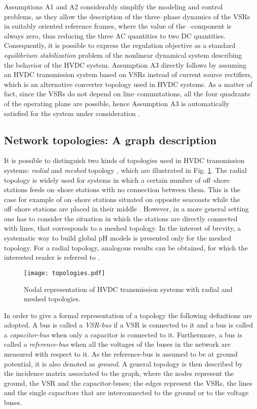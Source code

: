 \documentclass[5p,twocolumn]{elsarticle}
\numberwithin{equation}{section}
\begin{document}
Assumptions A1 and A2 considerably simplify the modeling and control problems, as they allow the description of the three--phase dynamics of the VSRs in suitably oriented  reference frames, where the value
of the --component is always zero, thus reducing the three AC quantities to two DC quantities. Consequently, it is possible to express the regulation objective as a standard {\em equilibrium stabilization}
problem of the nonlinear dynamical system describing the behavior of the HVDC system. Assumption A3 directly follows by assuming an HVDC transmission system based on VSRs instead of current source rectifiers,
which is an alternative converter topology used in HVDC systems. As a matter of fact, since the VSRs do not depend on line--commutations, all the four quadrants of the operating plane are possible, hence
Assumption A3 is automatically satisfied for the system under consideration  \cite{abbas}.

\subsection{Network topologies: A graph description}
It is possible to distinguish two kinds of topologies used in  HVDC transmission systems: \textit{radial} and \textit{meshed} topology \cite{agelidis,bucher,gomis}, which are illustrated in Fig. \ref{topo}. The
radial topology is widely used for systems in which a certain number of off--shore stations feeds on--shore stations with no connection between them. This is the case for example of on--shore stations situated
on opposite seacoasts while the off--shore stations are placed in their middle \cite{bucher,kirby}. However, in a more general setting one has to consider the situation in which the stations are directly connected with lines, that corresponds to a meshed topology. In the interest of brevity, a systematic
way to build global pH models is presented only for the {meshed} topology. For a {radial topology}, analogous results can be obtained, for which the interested reader is referred to \cite{ECCZonetti}.

\begin{figure}[ht]
 \centering
 \texttt{[image: topologies.pdf]}
 \caption{Nodal representation of HVDC transmission systems with radial and meshed topologies.}
 \label{topo}
\end{figure}

In order to give a formal representation of a topology the following definitions are adopted. A bus is called a \textit{VSR-bus} if a VSR is connected to it and a bus is called a
\textit{capacitor-bus} when only a capacitor is connected to it. Furthermore, a bus is called a \textit{reference-bus} when all the voltages of the buses in the network are measured with
respect to it. As the {reference-bus} is assumed to be at ground potential, it is also denoted as \textit{ground}. A general topology is then described by the incidence matrix  associated
to the graph, where the nodes represent the {ground}, the {VSR} and the {capacitor-buses}; the edges represent the VSRs, the lines and the single capacitors that are interconnected to the
{ground} or to the voltage buses.
\end{document}
